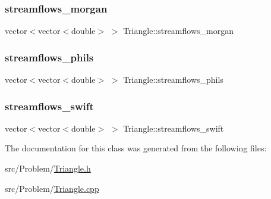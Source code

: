 \subsubsection{\texorpdfstring{streamflows\+\_\+morgan}{streamflows\_morgan}}
{\footnotesize\ttfamily vector$<$vector$<$double$>$ $>$ Triangle\+::streamflows\+\_\+morgan\hspace{0.3cm}{\ttfamily [private]}}

\mbox{\label{classTriangle_a936a703fc9bb94bce59bb0cbec005115_a936a703fc9bb94bce59bb0cbec005115}} 
\subsubsection{\texorpdfstring{streamflows\+\_\+phils}{streamflows\_phils}}
{\footnotesize\ttfamily vector$<$vector$<$double$>$ $>$ Triangle\+::streamflows\+\_\+phils\hspace{0.3cm}{\ttfamily [private]}}

\mbox{\label{classTriangle_a6fc8ddba9b9c2afea0ff19ac21343807_a6fc8ddba9b9c2afea0ff19ac21343807}} 
\subsubsection{\texorpdfstring{streamflows\+\_\+swift}{streamflows\_swift}}
{\footnotesize\ttfamily vector$<$vector$<$double$>$ $>$ Triangle\+::streamflows\+\_\+swift\hspace{0.3cm}{\ttfamily [private]}}



The documentation for this class was generated from the following files\+:\begin{DoxyCompactItemize}
\item 
src/\+Problem/\mbox{\hyperlink{Triangle_8h}{Triangle.\+h}}\item 
src/\+Problem/\mbox{\hyperlink{Triangle_8cpp}{Triangle.\+cpp}}\end{DoxyCompactItemize}
